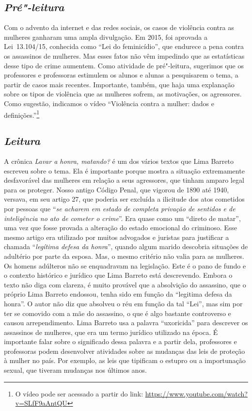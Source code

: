 \documentclass{extarticle}
\begin{document}
\subsection{\textit{Pré"-leitura}}

Com o advento da internet e das redes sociais, os casos de violência
contra as mulheres ganharam uma ampla divulgação. Em 2015, foi aprovada
a Lei~13.104/15, conhecida como ``Lei do feminicídio'', que endurece a
pena contra os assassinos de mulheres. Mas esses fatos não vêm impedindo
que as estatísticas desse tipo de crime aumentem. Como atividade de
pré"-leitura, sugerimos que os professores e professoras estimulem os
alunos e alunas a pesquisarem o tema, a partir de casos mais recentes.
Importante, também, que haja uma explanação sobre os tipos de violência
que as mulheres sofrem, as motivações, os agressores. Como sugestão,
indicamos o vídeo ``Violência contra a mulher: dados e
definições.''\footnote{O vídeo pode ser acessado a partir do link:
  \url{https://www.youtube.com/watch?v=SLfF9aAntQU}}


\subsection{\textit{Leitura}}
	
A crônica {\textit{Lavar a honra, matando?}} é um dos vários textos
que Lima Barreto escreveu sobre o tema. Ela é importante porque mostra a
situação extremamente desfavorável das mulheres em relação a seus
agressores, que tinham amparo legal para os proteger. Nosso antigo
Código Penal, que vigorou de 1890 até 1940, versava, em seu artigo 27,
que poderia ser excluída a ilicitude dos atos cometidos por pessoas que
``\emph{se acharem em estado de completa privação de sentidos e de
inteligência no ato de cometer o crime}''. Era quase como um ``direto de
matar'', uma vez que fosse provada a alteração do estado emocional do
criminoso. Esse mesmo artigo era utilizado por muitos advogados e
juristas para justificar a chamada ``\emph{legítima defesa da honra}'',
quando algum marido descobria situações de adultério por parte da
esposa. Mas, o mesmo critério não valia para as mulheres. Os homens
adúlteros não se enquadravam na legislação. Este é o pano de fundo e o
contexto histórico e jurídico que Lima Barreto está descrevendo. Embora
o texto não diga com clareza, é muito provável que a absolvição do
assassino, que o próprio Lima Barreto endossou, tenha sido em função da
``legitima defesa da honra''. O autor não diz que absolveu o réu em
função da tal ``Lei'', mas sim por ter se comovido com a mãe do
assassino, o que é algo bastante controverso e causou arrependimento.
Lima Barreto usa a palavra ``uxoricida'' para descrever os assassinos de
mulheres, que era um termo jurídico utilizado na época. É importante
falar sobre o significado dessa palavra e a partir dela, professores e
professoras podem desenvolver atividades sobre as mudanças das leis de
proteção à mulher no país. Por exemplo, as leis que tipificam o estupro
ou a importunação sexual, que tiveram mudanças nos últimos anos.
\end{document}
